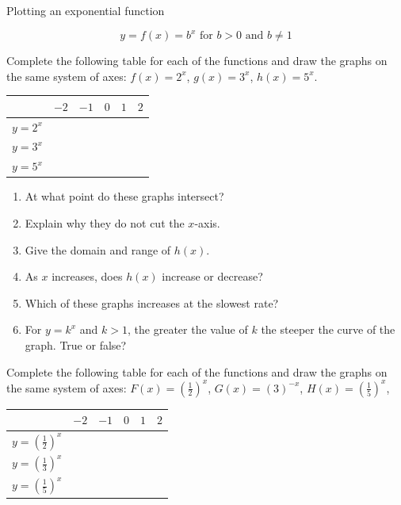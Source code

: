 \begin{wex}{Plotting an exponential function}
 {
\begin{equation*} y=f(x) =b^{x} \mbox{ for } b>0 \mbox{ and } b \neq 1 \end{equation*}

Complete the following table for each of the functions and draw the graphs on the same system of axes:
$f(x)=2^{x}$, $g(x)=3^{x}$, $h(x)=5^{x}$.


\begin{table}[H]
\begin{center}
\begin{tabular}{|c|c|c|c|c|c|}
\hline
   &  $-2$ & $-1$ & $0$ & $1$ & $2$ 
\\ \hline
 $y=2^{x}$&  &&&&
\\ \hline
 $y=3^{x}$&  &&&&
\\ \hline
 $y=5^{x}$&  &&&&
\\ \hline

\end{tabular}
\end{center}
\end{table}

\begin{enumerate}[noitemsep, label=\textbf{\arabic*}. ] 
 \item At what point do these graphs intersect?
\item Explain why they do not cut the $x$-axis.
\item Give the domain and range of $h(x)$.
 \item As $x$ increases, does $h(x)$ increase or decrease?
\item Which of these graphs increases at the slowest rate?
\item For $y=k^{x}$ and $k>1$, the greater the value of $k$ the steeper the curve of the graph. True or false?
\end{enumerate}

Complete the following table for each of the functions and draw the graphs on the same system of axes:
$F(x) =(\frac{1}{2})^{x}$, $G(x) =(3)^{-x}$, $H(x) =(\frac{1}{5})^{x}$, 
\begin{table}[H]
\begin{center}
\begin{tabular}{|c|c|c|c|c|c|}
\hline
   &  $-2$ & $-1$ & $0$ & $1$ & $2$ 
\\ \hline
 $y=(\frac{1}{2})^{x}$&  &&&&
\\ \hline
$y=(\frac{1}{3})^{x}$&  &&&&
\\ \hline
$y=(\frac{1}{5})^{x}$&  &&&&
\\ \hline


\end{tabular}
\end{center}
\end{table}}
\end{wex}
